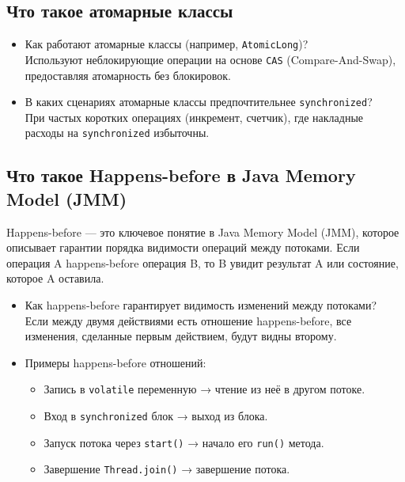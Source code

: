 \documentclass[a4paper,14pt]{article}
\begin{document}
\subsection{Что такое атомарные классы}

\begin{itemize}
\item Как работают атомарные классы (например, \texttt{AtomicLong})? \\
Используют неблокирующие операции на основе \texttt{CAS} (Compare-And-Swap), предоставляя атомарность без блокировок.

\item В каких сценариях атомарные классы предпочтительнее \texttt{synchronized}? \\
При частых коротких операциях (инкремент, счетчик), где накладные расходы на \texttt{synchronized} избыточны.
\end{itemize}

\subsection{Что такое Happens-before в Java Memory Model (JMM)}
Happens-before — это ключевое понятие в Java Memory Model (JMM), которое описывает гарантии порядка видимости операций между потоками.
Если операция A happens-before операция B, то B увидит результат A или состояние, которое A оставила.
\begin{itemize}
\item Как happens-before гарантирует видимость изменений между потоками? \\
Если между двумя действиями есть отношение happens-before, все изменения, сделанные первым действием, будут видны второму.

\item Примеры happens-before отношений: \
\begin{itemize}
\item Запись в \texttt{volatile} переменную → чтение из неё в другом потоке.
\item Вход в \texttt{synchronized} блок → выход из блока.
\item Запуск потока через \texttt{start()} → начало его \texttt{run()} метода.
\item Завершение \texttt{Thread.join()} → завершение потока.
\end{itemize}
\end{itemize}
\end{document}

